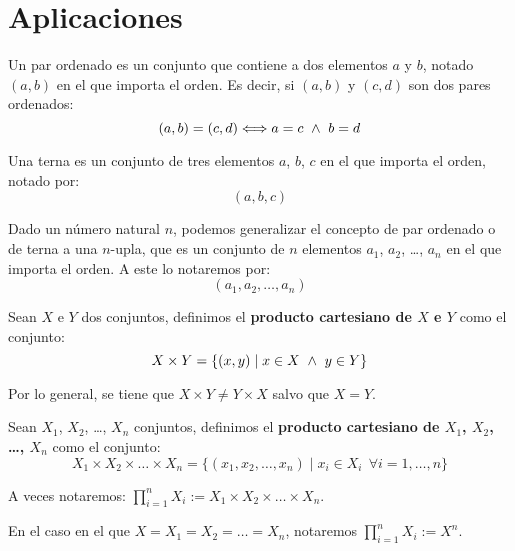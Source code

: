 \section{Aplicaciones}

\begin{definicion}
    Un par ordenado es un conjunto que contiene a dos elementos $a$ y $b$, notado $(a,b)$ en el que importa el orden. Es decir, si $(a,b)$ y $(c,d)$ son dos pares ordenados:
    $$(a,b) = (c,d) \Longleftrightarrow a = c \ \land \  b = d$$
\end{definicion}

\begin{definicion}[Terna]
    Una terna es un conjunto de tres elementos $a$, $b$, $c$ en el que importa el orden, notado por:
    \begin{equation*}
        (a,b,c)
    \end{equation*}
\end{definicion}

\begin{definicion}[$n$-upla]
    Dado un número natural $n$, podemos generalizar el concepto de par ordenado o de terna a una $n$-upla, que es un conjunto de $n$ elementos $a_1$, $a_2$, \ldots, $a_n$ en el que importa el orden. A este lo notaremos por:
    \begin{equation*}
        (a_1,a_2,\ldots,a_n)
    \end{equation*}
\end{definicion}

\begin{definicion}
    Sean $X$ e $Y$ dos conjuntos, definimos el \textbf{producto cartesiano de $X$ e $Y$} como el conjunto:
    $$X\times Y = \{(x,y) \mid x \in X \ \land \  y \in Y\}$$
\end{definicion}

Por lo general, se tiene que $X \times Y \neq Y \times X$ salvo que $X = Y$.

\begin{definicion}
    Sean $X_1$, $X_2$, \ldots, $X_n$ conjuntos, definimos el \textbf{producto cartesiano de $X_1$, $X_2$,
        \ldots, $X_n$} como el conjunto:
    $$X_1 \times X_2 \times \ldots \times X_n = \{(x_1, x_2, \ldots, x_n) \mid x_i \in X_i ~~\forall i=1,\ldots,n \}$$
\end{definicion}
\begin{notacion}
    A veces notaremos: $\prod\limits_{i=1}^n X_i := X_1 \times X_2 \times \ldots \times X_n $.

    En el caso en el que $X=X_1 = X_2 = \ldots = X_n$, notaremos $\prod\limits_{i=1}^n X_i := X^n$.
\end{notacion}

